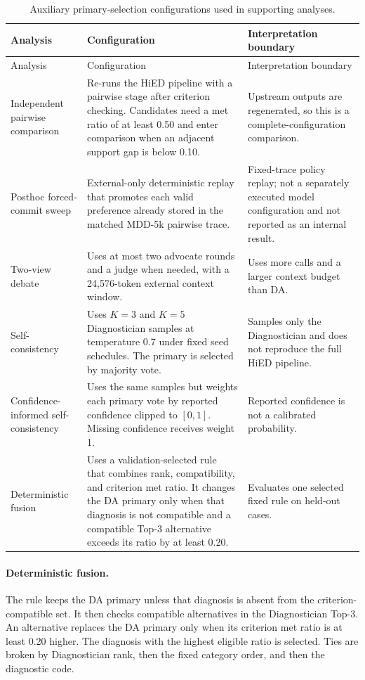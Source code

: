 \begingroup
\small
\begin{longtable}{|>{\raggedright\arraybackslash}p{3.2cm}|>{\raggedright\arraybackslash}p{6.0cm}|>{\raggedright\arraybackslash}p{5.0cm}|}
\caption{Auxiliary primary-selection configurations used in supporting analyses.}
\label{tab:additional-inference-configs}\\
\hline
Analysis & Configuration & Interpretation boundary\\
\hline
\endfirsthead
\hline
Analysis & Configuration & Interpretation boundary\\
\hline
\endhead
Independent pairwise comparison & Re-runs the HiED pipeline with a pairwise stage after criterion checking. Candidates need a met ratio of at least 0.50 and enter comparison when an adjacent support gap is below 0.10. & Upstream outputs are regenerated, so this is a complete-configuration comparison.\\
\hline
Posthoc forced-commit sweep & External-only deterministic replay that promotes each valid preference already stored in the matched MDD-5k pairwise trace. & Fixed-trace policy replay; not a separately executed model configuration and not reported as an internal result.\\
\hline
Two-view debate & Uses at most two advocate rounds and a judge when needed, with a 24,576-token external context window. & Uses more calls and a larger context budget than DA.\\
\hline
Self-consistency & Uses $K=3$ and $K=5$ Diagnostician samples at temperature 0.7 under fixed seed schedules. The primary is selected by majority vote. & Samples only the Diagnostician and does not reproduce the full HiED pipeline.\\
\hline
Confidence-informed self-consistency & Uses the same samples but weights each primary vote by reported confidence clipped to $[0,1]$. Missing confidence receives weight 1. & Reported confidence is not a calibrated probability.\\
\hline
Deterministic fusion & Uses a validation-selected rule that combines rank, compatibility, and criterion met ratio. It changes the DA primary only when that diagnosis is not compatible and a compatible Top-3 alternative exceeds its ratio by at least 0.20. & Evaluates one selected fixed rule on held-out cases.\\
\hline
\end{longtable}
\endgroup

\paragraph{Deterministic fusion.}
The rule keeps the DA primary unless that diagnosis is absent from the criterion-compatible set. It then checks compatible alternatives in the Diagnostician Top-3. An alternative replaces the DA primary only when its criterion met ratio is at least 0.20 higher. The diagnosis with the highest eligible ratio is selected. Ties are broken by Diagnostician rank, then the fixed category order, and then the diagnostic code.


